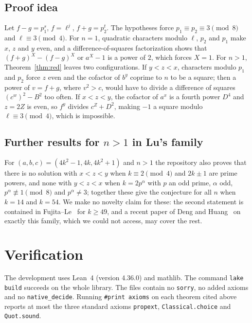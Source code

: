 \documentclass[11pt,a4paper]{article}
\theoremstyle{remark}
\newcommand{\lean}[1]{\texttt{#1}}
\begin{document}
\subsection*{Proof idea}

Let $f-g=p_1^{s}$, $f=\ell^{j}$, $f+g=p_2^{t}$. The hypotheses force
$p_1\equiv p_2\equiv 3 \pmod 8$ and $\ell\equiv 3 \pmod 4$. For $n=1$,
quadratic characters modulo $\ell$, $p_2$ and $p_1$ make $x$, $z$ and $y$ even,
and a difference-of-squares factorization shows that $(f+g)^X-(f-g)^X$ or
$a^X-1$ is a power of $2$, which forces $X=1$. For $n>1$,
Theorem~\ref{thm:red} leaves two configurations. If $y<z<x$, characters modulo
$p_1$ and $p_2$ force $z$ even and the cofactor of $b^y$ coprime to $n$ to be a
square; then a power of $v=f+g$, where $v^2>c$, would have to divide a
difference of squares $(c^{w})^2-B^2$ too often. If $x<z<y$, the cofactor of
$a^x$ is a fourth power $D^4$ and $z=2Z$ is even, so $f^{y}$ divides
$c^{Z}+D^{2}$, making $-1$ a square modulo $\ell\equiv 3 \pmod 4$, which is
impossible.

\subsection*{Further results for $n>1$ in Lu's family}

For $(a,b,c)=(4k^2-1,4k,4k^2+1)$ and $n>1$ the repository also proves that
there is no solution with $x<z<y$ when $k\equiv 2 \pmod 4$ and $2k\pm 1$ are
prime powers, and none with $y<z<x$ when $k=2p^\alpha$ with $p$ an odd prime,
$\alpha$ odd, $p^\alpha\not\equiv 1 \pmod 8$ and $p^\alpha\ne 3$; together
these give the conjecture for all $n$ when $k=14$ and $k=54$. We make no
novelty claim for these: the second statement is contained in
Fujita--Le~\cite{FL} for $k\ge 49$, and a recent paper of Deng and
Huang~\cite{DH26} on exactly this family, which we could not access, may cover
the rest.

\section{Verification}

The development uses Lean~4 (version 4.36.0) and mathlib. The command
\lean{lake build} succeeds on the whole library. The files contain no
\lean{sorry}, no added axioms and no \lean{native\_decide}. Running
\lean{\#print axioms} on each theorem cited above reports at most the three
standard axioms \lean{propext}, \lean{Classical.choice} and \lean{Quot.sound}.
\end{document}
